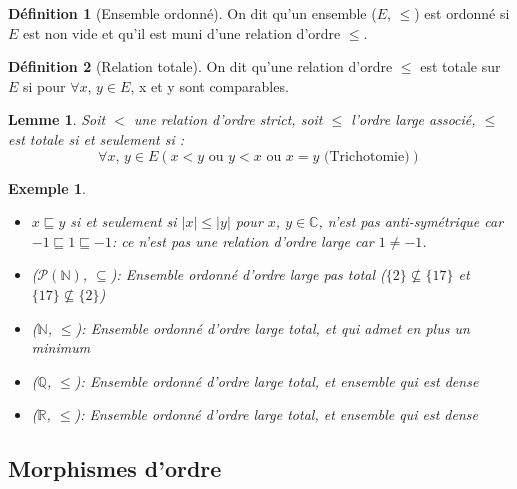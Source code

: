 \documentclass{article}
\theoremstyle{definition}
\newtheorem{definition}{Définition}
\theoremstyle{definition}
\theoremstyle{definition}
\theoremstyle{plain}
\newtheorem{example}{Exemple}
\theoremstyle{theorem}
\theoremstyle{theorem}
\newtheorem{lemma}{Lemme}
\begin{document}
\begin{definition}[Ensemble ordonné]

    On dit qu'un ensemble ($E$, $\leqslant$) est ordonné si $E$ est non vide et qu'il est muni d'une relation d'ordre $\leqslant$.

\end{definition}

\begin{definition}[Relation totale]

    On dit qu'une relation d'ordre $\leqslant$ est totale sur $E$ si pour $\forall x$, $y \in E$, x et y sont comparables.

\end{definition}

\begin{lemma}

    Soit $<$ une relation d'ordre strict, soit $\leqslant$ l'ordre large associé, $\leqslant$ est totale si et seulement si :
	\begin{equation*}
        \forall x \text{, } y \in E (x < y \text{ ou } y < x \text{ ou } x = y \text{ (Trichotomie)})
	\end{equation*}
	\noindent

\end{lemma}

\begin{example}
    \begin{itemize}
        \item $x \sqsubseteq y$ si et seulement si $|x| \leqslant |y|$ pour $x$, $y \in \mathbb{C}$, n'est pas anti-symétrique
            car $-1 \sqsubseteq 1 \sqsubseteq -1$: ce n'est pas une relation d'ordre large car $1 \neq -1$.
        \item ($\mathscr{P}(\mathbb{N})$, $\subseteq$): Ensemble ordonné d'ordre large pas total ($\{2\} \nsubseteq \{17\}$ et $\{17\} \nsubseteq \{2\}$)
        \item ($\mathbb{N}$, $\leqslant$): Ensemble ordonné d'ordre large total, et qui admet en plus un minimum
        \item ($\mathbb{Q}$, $\leqslant$): Ensemble ordonné d'ordre large total, et ensemble qui est dense
        \item ($\mathbb{R}$, $\leqslant$): Ensemble ordonné d'ordre large total, et ensemble qui est dense
    \end{itemize} 
\end{example}

\subsection{Morphismes d'ordre}
\end{document}
